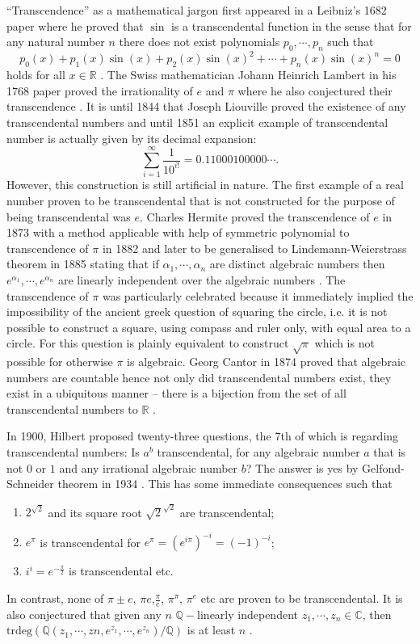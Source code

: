 \documentclass{report}
\begin{document}
``Transcendence'' as a mathematical jargon first appeared in a Leibniz's 1682 paper where he proved that $\sin$ is a transcendental function in the sense that for any natural number $n$ there does not exist polynomials $p_0,\cdots,p_n$ such that
$$p_0(x)+p_1(x)\sin(x)+p_2(x)\sin(x)^2+\cdots+p_n(x)\sin(x)^n=0$$
holds for all $x\in\mathbb R$ \cite{bourbaki1998elements}. The Swiss mathematician Johann Heinrich Lambert in his 1768 paper proved the irrationality of $e$ and $\pi$ where he also conjectured their transcendence \cite{lambert2004memoire}. It is until 1844 that Joseph Liouville proved the existence of any transcendental numbers and until 1851 an explicit example of transcendental number is actually given by its decimal expansion:\cite{10.2307/1988833}
$$\sum_{i=1}^\infty\frac1{10^{i!}}=0.11000100000\cdots.$$
However, this construction is still artificial in nature. The first example of a real number proven to be transcendental that is not constructed for the purpose of being transcendental was $e$. Charles Hermite proved the transcendence of $e$ in 1873 with a method applicable with help of symmetric polynomial to transcendence of $\pi$ in 1882 and later to be generalised to Lindemann-Weierstrass theorem in 1885 stating that if $\alpha_1,\cdots, \alpha_n$ are distinct algebraic numbers then $e^{\alpha_1},\cdots,e^{\alpha_n}$ are linearly independent over the algebraic numbers \cite{baker1990transcendental}. The transcendence of $\pi$ was particularly celebrated because it immediately implied the impossibility of the ancient greek question of squaring the circle, i.e. it is not possible to construct a square, using compass and ruler only, with equal area to a circle. For this question is plainly equivalent to construct $\sqrt\pi$ which is not possible for otherwise $\pi$ is algebraic. Georg Cantor in 1874 proved that algebraic numbers are countable hence not only did transcendental numbers exist, they exist in a ubiquitous manner -- there is a bijection from the set of all transcendental numbers to $\mathbb R$ \cite{cantor1932uber,cantor1878beitrag}.

In 1900, Hilbert proposed twenty-three questions, the 7th of which is regarding transcendental numbers: Is $a^b$ transcendental, for any algebraic number $a$ that is not $0$ or $1$ and any irrational algebraic number $b$? The answer is yes by Gelfond-Schneider theorem in 1934 \cite{gelfond1934septieme}. This has some immediate consequences such that
\begin{enumerate}
  \item $2^{\sqrt2}$ and its square root ${\sqrt2}^{\sqrt2}$ are transcendental;
  \item $e^{\pi}$ is transcendental for $e^{\pi}=\left(e^{i\pi}\right)^{-i}=\left(-1\right)^{-i}$;
  \item $i^i=e^{-\frac\pi2}$ is transcendental etc.
\end{enumerate}
In contrast, none of $\pi\pm e$, $\pi e$,$\frac\pi e$, $\pi^\pi$, $\pi^e$ etc are proven to be transcendental. It is also conjectured that given any $n$ $\mathbb Q-$linearly independent $z_1,\cdots, z_n\in\mathbb C$, then $\mathrm{trdeg}\left(\mathbb Q(z_1,\cdots, zn, e^{z_1},\cdots, e^{z_n})/\mathbb Q\right)$ is at least $n$ \cite{lang1966introduction}.
\end{document}
